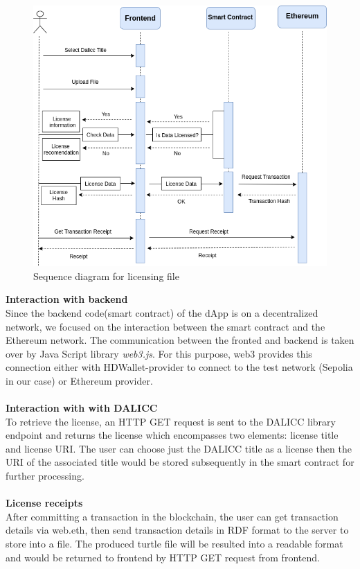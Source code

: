  \begin{center}
 	
 	\begin{figure}[htb!]
 		
 		\begin{minipage}{0.75\linewidth}
 			
 			\includegraphics[width=1.45\textwidth]{images/chap03_user_roadmap.png}
 		\end{minipage}
 		\caption{Sequence diagram for licensing file}
  	\end{figure}
  \end{center}
 \textbf{Interaction with backend}\\
 Since the backend code(smart contract) of the dApp is on a decentralized network, we focused on the interaction between the smart contract and the Ethereum network. The communication between the fronted and backend is taken over by Java Script library \textit{web3.js}.
 For this purpose, web3 provides this connection either with HDWallet-provider to connect to the test network (Sepolia in our case) or Ethereum provider.\\
 \\
 \textbf{Interaction with with DALICC} \\
 To retrieve the license, an HTTP GET request is sent to the DALICC library endpoint and returns the license which encompasses two elements: license title and license URI. The user can choose just the DALICC title as a license then the URI of the associated title would be stored subsequently in the smart contract for further processing. \\
 \\
\textbf{License receipts}\\
After committing a transaction in the blockchain, the user can get transaction details via web.eth, then send transaction details in RDF format to the server to store into a file. The produced turtle file will be resulted into a readable format and would be returned to frontend by HTTP GET request from frontend.
\\
